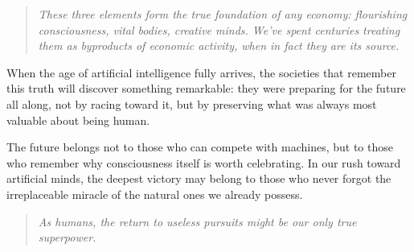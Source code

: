 \documentclass[11pt]{article}
\newenvironment{pullquote}
  {\begin{quote}\itshape\color{blue!40!black}}
  {\end{quote}}
\begin{document}
\begin{pullquote}
These three elements form the true foundation of any economy: flourishing
consciousness, vital bodies, creative minds. We've spent centuries treating them
as byproducts of economic activity, when in fact they are its source.
\end{pullquote}

When the age of artificial intelligence fully arrives, the societies that
remember this truth will discover something remarkable: they were preparing for
the future all along, not by racing toward it, but by preserving what was always
most valuable about being human.

The future belongs not to those who can compete with machines, but to those who
remember why consciousness itself is worth celebrating. In our rush toward
artificial minds, the deepest victory may belong to those who never forgot the
irreplaceable miracle of the natural ones we already possess.

\begin{pullquote}
As humans, the return to useless pursuits might be our only true superpower.
\end{pullquote}
\end{document}
